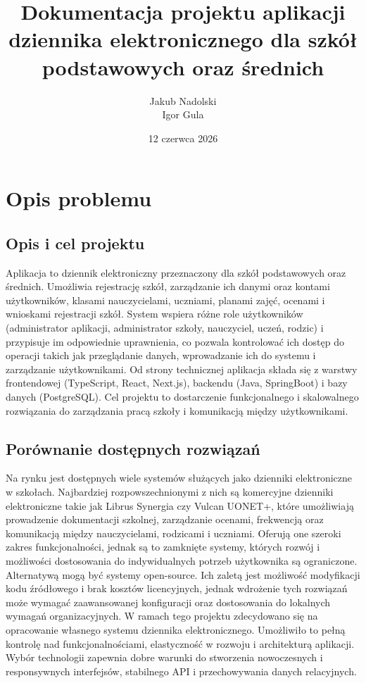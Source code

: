 \documentclass[12pt,a4paper]{article}
\title{Dokumentacja projektu aplikacji dziennika elektronicznego dla szkół podstawowych oraz średnich}
\author{Jakub Nadolski \\ Igor Gula}
\date{12 czerwca 2026}
\begin{document}
\maketitle

\newpage

\tableofcontents

\newpage

\section{Opis problemu}
\subsection{Opis i cel projektu}
Aplikacja to dziennik elektroniczny przeznaczony dla szkół podstawowych oraz średnich. Umożliwia rejestrację szkół, zarządzanie ich danymi oraz kontami użytkowników, klasami nauczycielami, uczniami, planami zajęć, ocenami i wnioskami rejestracji szkół. System wspiera różne role użytkowników (administrator aplikacji, administrator szkoły, nauczyciel, uczeń, rodzic) i przypisuje im odpowiednie uprawnienia, co pozwala kontrolować ich dostęp do operacji takich jak przeglądanie danych, wprowadzanie ich do systemu i zarządzanie użytkownikami. Od strony technicznej aplikacja składa się z warstwy frontendowej (TypeScript, React, Next.js), backendu (Java, SpringBoot) i bazy danych (PostgreSQL). Cel projektu to dostarczenie funkcjonalnego i skalowalnego rozwiązania do zarządzania pracą szkoły i komunikacją między użytkownikami.

\subsection{Porównanie dostępnych rozwiązań}
Na rynku jest dostępnych wiele systemów służących jako dzienniki elektroniczne w szkołach. Najbardziej rozpowszechnionymi z nich są komercyjne dzienniki elektroniczne takie jak Librus Synergia czy Vulcan UONET+, które umożliwiają prowadzenie dokumentacji szkolnej, zarządzanie ocenami, frekwencją oraz komunikacją między nauczycielami, rodzicami i uczniami. Oferują one szeroki zakres funkcjonalności, jednak są to zamknięte systemy, których rozwój i możliwości dostosowania do indywidualnych potrzeb użytkownika są ograniczone. Alternatywą mogą być systemy open-source. Ich zaletą jest możliwość modyfikacji kodu źródłowego i brak kosztów licencyjnych, jednak wdrożenie tych rozwiązań może wymagać zaawansowanej konfiguracji oraz dostosowania do lokalnych wymagań organizacyjnych. W ramach tego projektu zdecydowano się na opracowanie własnego systemu dziennika elektronicznego. Umożliwiło to pełną kontrolę nad funkcjonalnościami, elastyczność w rozwoju i architekturą aplikacji. Wybór technologii zapewnia dobre warunki do stworzenia nowoczesnych i responsywnych interfejsów, stabilnego API i przechowywania danych relacyjnych.
\end{document}

